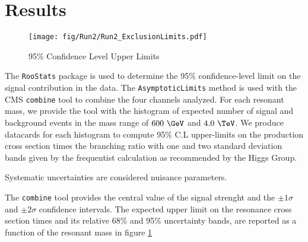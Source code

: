 \section{Results}

\begin{figure}[tph]
  \centering
  \texttt{[image: fig/Run2/Run2\_ExclusionLimits.pdf]}
  \caption{95\% Confidence Level Upper Limits}
  \label{fig:BrazilianPlot}
\end{figure}

The \verb|RooStats| package is used to determine the 95\% confidence-level limit
on the signal contribution in the data. The \verb|AsymptoticLimits| method is
used with the CMS \verb|combine| tool to combine the four channels analyzed.
For each resonant mass, we provide the tool with the histogram of expected number
of signal and background events in the mass range of $600~\GeV$ and $4.0~\TeV$.
We produce datacards for each histogram to compute 95\% C.L upper-limits on the
production cross section times the branching ratio with one and two standard
deviation bands given by the frequentist calculation as recommended by the
Higgs Group.

Systematic uncertainties are considered nuisance parameters.

The \verb|combine| tool provides the central value of the signal strenght
and the $\pm1\sigma$ and $\pm2\sigma$ confidence intervals.
The expected upper limit on the resonance cross section times and its relative
68\% and 95\% uncertainty bands, are reported as a function of the resonant mass
in figure \ref{fig:BrazilianPlot}


